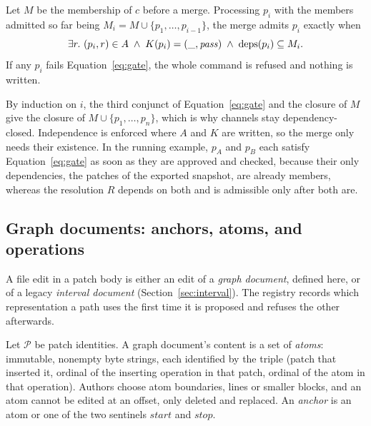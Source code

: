 \begin{definition}[Admission]\label{def:admission}
Let $M$ be the membership of $c$ before a merge. Processing $p_i$ with the members admitted so far being $M_i=M\cup\{p_1,\dots,p_{i-1}\}$, the merge admits $p_i$ exactly when
\begin{equation}
 \exists r.\ (p_i,r)\in A
 \;\land\; K(p_i)=(\_,\mathit{pass})
 \;\land\; \operatorname{deps}(p_i)\subseteq M_i .
 \label{eq:gate}
\end{equation}
If any $p_i$ fails Equation~\ref{eq:gate}, the whole command is refused and nothing is written.
\end{definition}
By induction on $i$, the third conjunct of Equation~\ref{eq:gate} and the closure of $M$ give the closure of $M\cup\{p_1,\dots,p_n\}$, which is why channels stay dependency-closed. Independence is enforced where $A$ and $K$ are written, so the merge only needs their existence. In the running example, $p_A$ and $p_B$ each satisfy Equation~\ref{eq:gate} as soon as they are approved and checked, because their only dependencies, the patches of the exported snapshot, are already members, whereas the resolution $R$ depends on both and is admissible only after both are.

\subsection{Graph documents: anchors, atoms, and operations}\label{sec:documents}
A file edit in a patch body is either an edit of a \emph{graph document}, defined here, or of a legacy \emph{interval document} (Section~\ref{sec:interval}). The registry records which representation a path uses the first time it is proposed and refuses the other afterwards.

Let $\mathcal{P}$ be patch identities. A graph document's content is a set of \emph{atoms}: immutable, nonempty byte strings, each identified by the triple (patch that inserted it, ordinal of the inserting operation in that patch, ordinal of the atom in that operation). Authors choose atom boundaries, lines or smaller blocks, and an atom cannot be edited at an offset, only deleted and replaced. An \emph{anchor} is an atom or one of the two sentinels $\mathit{start}$ and $\mathit{stop}$.

